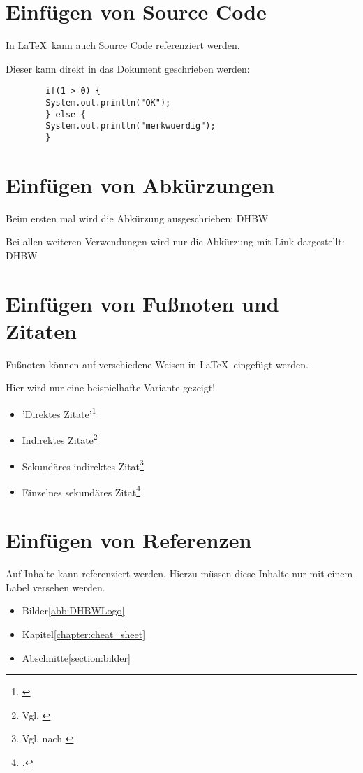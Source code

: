 \section{Einfügen von Source Code}\label{section:source_code}

\lstset{language=Java}

    In \LaTeX\ kann auch Source Code referenziert werden.

    Dieser kann direkt in das Dokument geschrieben werden:

    \begin{lstlisting}
        if(1 > 0) {
        System.out.println("OK"); 
        } else {
        System.out.println("merkwuerdig");
        }
    \end{lstlisting}

\section{Einfügen von Abkürzungen}\label{section:abkuerzungen}

Beim ersten mal wird die Abkürzung ausgeschrieben: \ac{DHBW}

Bei allen weiteren Verwendungen wird nur die Abkürzung mit Link dargestellt: \ac{DHBW}

\section{Einfügen von Fußnoten und Zitaten}\label{section:zitate}

Fußnoten können auf verschiedene Weisen in \LaTeX\ eingefügt werden.

Hier wird nur eine beispielhafte Variante gezeigt!

    \begin{itemize}
        \item 'Direktes Zitate'\footnote{\cite[S. 114ff.]{Mayring2002}}
        \item Indirektes Zitate\footnote{Vgl. \cite[S. 114ff.]{Mayring2002}}
        \item Sekundäres indirektes Zitat\footnote{Vgl. \cite[S. 114ff.]{Mayring2002} nach \cite{Endres}}
        \item Einzelnes sekundäres Zitat\footcite[Vgl.][S.1]{W3SchoolUnderscore}
    \end{itemize}

\section{Einfügen von Referenzen}\label{section:referenzen}

Auf Inhalte kann referenziert werden. Hierzu müssen diese Inhalte nur mit einem Label versehen werden.

    \begin{itemize}
        \item Bilder\ref{abb:DHBWLogo}
        \item Kapitel\ref{chapter:cheat_sheet}
        \item Abschnitte\ref{section:bilder}
    \end{itemize}

